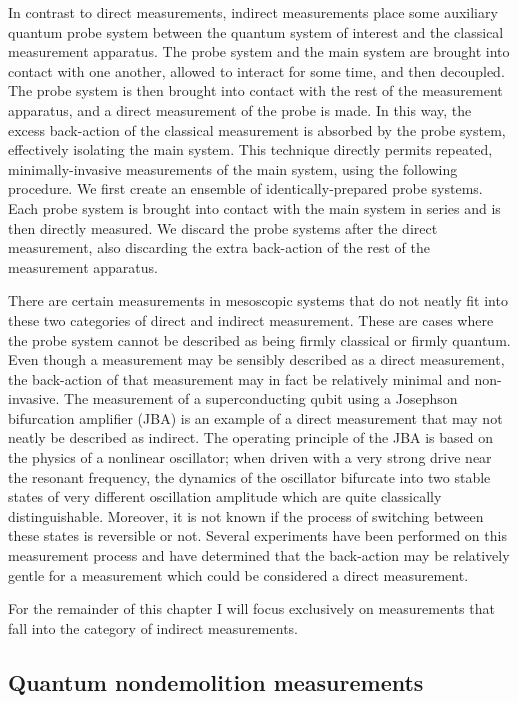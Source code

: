 In contrast to direct measurements, indirect measurements place some auxiliary quantum probe system between the quantum system of interest and the classical measurement apparatus.  The probe system and the main system are brought into contact with one another, allowed to interact for some time, and then decoupled.  The probe system is then brought into contact with the rest of the measurement apparatus, and a direct measurement of the probe is made.  In this way, the excess back-action of the classical measurement is absorbed by the probe system, effectively isolating the main system.  This technique directly permits repeated, minimally-invasive measurements of the main system, using the following procedure.  We first create an ensemble of identically-prepared probe systems.  Each probe system is brought into contact with the main system in series and is then directly measured.  We discard the probe systems after the direct measurement, also discarding the extra back-action of the rest of the measurement apparatus.

There are certain measurements in mesoscopic systems that do not neatly fit into these two categories of direct and indirect measurement.  These are cases where the probe system cannot be described as being firmly classical or firmly quantum.  Even though a measurement may be sensibly described as a direct measurement, the back-action of that measurement may in fact be relatively minimal and non-invasive.  The measurement of a superconducting qubit using a Josephson bifurcation amplifier (JBA) \cite{Vijay2009} is an example of a direct measurement that may not neatly be described as indirect.  The operating principle of the JBA is based on the physics of a nonlinear oscillator; when driven with a very strong drive near the resonant frequency, the dynamics of the oscillator bifurcate into two stable states of very different oscillation amplitude which are quite classically distinguishable.  Moreover, it is not known if the process of switching between these states is reversible or not.  Several experiments \cite{Lupascu2007,Boulant2007} have been performed on this measurement process and have determined that the back-action may be relatively gentle for a measurement which could be considered a direct measurement.

For the remainder of this chapter I will focus exclusively on measurements that fall into the category of indirect measurements.

\subsection{Quantum nondemolition measurements}

